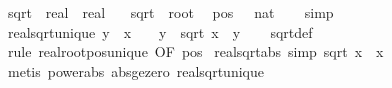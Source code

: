 \begin{isabellebody}
\ sqrt\ {\isacharcolon}{\kern0pt}{\isacharcolon}{\kern0pt}\ {\isachardoublequoteopen}real\ {\isasymRightarrow}\ real{\isachardoublequoteclose}\isanewline
\ \ \ {\isachardoublequoteopen}sqrt\ {\isacharequal}{\kern0pt}\ root\ {}{\isachardoublequoteclose}\isanewline
\isanewline
{}\isamarkupfalse%
\ pos{}{\isacharcolon}{\kern0pt}\ {\isachardoublequoteopen}{}\ {\isacharless}{\kern0pt}\ {\isacharparenleft}{\kern0pt}{}{\isacharcolon}{\kern0pt}{\isacharcolon}{\kern0pt}nat{\isacharparenright}{\kern0pt}{\isachardoublequoteclose}\isanewline
%
\isadelimproof
\ \ %
\endisadelimproof
%
\isatagproof
{}\isamarkupfalse%
\ simp%
\endisatagproof
{\isafoldproof}%
%
\isadelimproof
\isanewline
%
\endisadelimproof
\isanewline
{}\isamarkupfalse%
\ real{\isacharunderscore}{\kern0pt}sqrt{\isacharunderscore}{\kern0pt}unique{\isacharcolon}{\kern0pt}\ {\isachardoublequoteopen}y\ {\isacharequal}{\kern0pt}\ x\ {\isasymLongrightarrow}\ {}\ {\isasymle}\ y\ {\isasymLongrightarrow}\ sqrt\ x\ {\isacharequal}{\kern0pt}\ y{\isachardoublequoteclose}\isanewline
%
\isadelimproof
\ \ %
\endisadelimproof
%
\isatagproof
{}\isamarkupfalse%
\ sqrt{\isacharunderscore}{\kern0pt}def\ \isamarkupfalse%
\ {\isacharparenleft}{\kern0pt}rule\ real{\isacharunderscore}{\kern0pt}root{\isacharunderscore}{\kern0pt}pos{\isacharunderscore}{\kern0pt}unique\ {\isacharbrackleft}{\kern0pt}OF\ pos{}{\isacharbrackright}{\kern0pt}{\isacharparenright}{\kern0pt}%
\endisatagproof
{\isafoldproof}%
%
\isadelimproof
\isanewline
%
\endisadelimproof
\isanewline
{}\isamarkupfalse%
\ real{\isacharunderscore}{\kern0pt}sqrt{\isacharunderscore}{\kern0pt}abs\ {\isacharbrackleft}{\kern0pt}simp{\isacharbrackright}{\kern0pt}{\isacharcolon}{\kern0pt}\ {\isachardoublequoteopen}sqrt\ {\isacharparenleft}{\kern0pt}x\ {\isacharequal}{\kern0pt}\ {\isasymbar}x{\isasymbar}{\isachardoublequoteclose}\isanewline
%
\isadelimproof
\ \ %
\endisadelimproof
%
\isatagproof
{}\isamarkupfalse%
\ {\isacharparenleft}{\kern0pt}metis\ power{}{\isacharunderscore}{\kern0pt}abs\ abs{\isacharunderscore}{\kern0pt}ge{\isacharunderscore}{\kern0pt}zero\ real{\isacharunderscore}{\kern0pt}sqrt{\isacharunderscore}{\kern0pt}unique{\isacharparenright}{\kern0pt}%
\endisatagproof
{\isafoldproof}%
%
\isadelimproof
\isanewline
%
\endisadelimproof
\isanewline
{}\isamarkupfalse%

\end{isabellebody}
